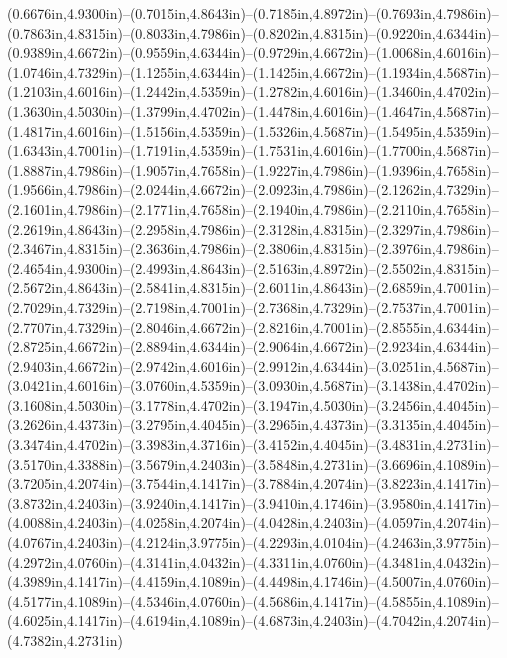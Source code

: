 (0.6676in,4.9300in)--(0.7015in,4.8643in)--(0.7185in,4.8972in)--(0.7693in,4.7986in)--(0.7863in,4.8315in)--(0.8033in,4.7986in)--(0.8202in,4.8315in)--(0.9220in,4.6344in)--(0.9389in,4.6672in)--(0.9559in,4.6344in)--(0.9729in,4.6672in)--(1.0068in,4.6016in)--(1.0746in,4.7329in)--(1.1255in,4.6344in)--(1.1425in,4.6672in)--(1.1934in,4.5687in)--(1.2103in,4.6016in)--(1.2442in,4.5359in)--(1.2782in,4.6016in)--(1.3460in,4.4702in)--(1.3630in,4.5030in)--(1.3799in,4.4702in)--(1.4478in,4.6016in)--(1.4647in,4.5687in)--(1.4817in,4.6016in)--(1.5156in,4.5359in)--(1.5326in,4.5687in)--(1.5495in,4.5359in)--(1.6343in,4.7001in)--(1.7191in,4.5359in)--(1.7531in,4.6016in)--(1.7700in,4.5687in)--(1.8887in,4.7986in)--(1.9057in,4.7658in)--(1.9227in,4.7986in)--(1.9396in,4.7658in)--(1.9566in,4.7986in)--(2.0244in,4.6672in)--(2.0923in,4.7986in)--(2.1262in,4.7329in)--(2.1601in,4.7986in)--(2.1771in,4.7658in)--(2.1940in,4.7986in)--(2.2110in,4.7658in)--(2.2619in,4.8643in)--(2.2958in,4.7986in)--(2.3128in,4.8315in)--(2.3297in,4.7986in)--(2.3467in,4.8315in)--(2.3636in,4.7986in)--(2.3806in,4.8315in)--(2.3976in,4.7986in)--(2.4654in,4.9300in)--(2.4993in,4.8643in)--(2.5163in,4.8972in)--(2.5502in,4.8315in)--(2.5672in,4.8643in)--(2.5841in,4.8315in)--(2.6011in,4.8643in)--(2.6859in,4.7001in)--(2.7029in,4.7329in)--(2.7198in,4.7001in)--(2.7368in,4.7329in)--(2.7537in,4.7001in)--(2.7707in,4.7329in)--(2.8046in,4.6672in)--(2.8216in,4.7001in)--(2.8555in,4.6344in)--(2.8725in,4.6672in)--(2.8894in,4.6344in)--(2.9064in,4.6672in)--(2.9234in,4.6344in)--(2.9403in,4.6672in)--(2.9742in,4.6016in)--(2.9912in,4.6344in)--(3.0251in,4.5687in)--(3.0421in,4.6016in)--(3.0760in,4.5359in)--(3.0930in,4.5687in)--(3.1438in,4.4702in)--(3.1608in,4.5030in)--(3.1778in,4.4702in)--(3.1947in,4.5030in)--(3.2456in,4.4045in)--(3.2626in,4.4373in)--(3.2795in,4.4045in)--(3.2965in,4.4373in)--(3.3135in,4.4045in)--(3.3474in,4.4702in)--(3.3983in,4.3716in)--(3.4152in,4.4045in)--(3.4831in,4.2731in)--(3.5170in,4.3388in)--(3.5679in,4.2403in)--(3.5848in,4.2731in)--(3.6696in,4.1089in)--(3.7205in,4.2074in)--(3.7544in,4.1417in)--(3.7884in,4.2074in)--(3.8223in,4.1417in)--(3.8732in,4.2403in)--(3.9240in,4.1417in)--(3.9410in,4.1746in)--(3.9580in,4.1417in)--(4.0088in,4.2403in)--(4.0258in,4.2074in)--(4.0428in,4.2403in)--(4.0597in,4.2074in)--(4.0767in,4.2403in)--(4.2124in,3.9775in)--(4.2293in,4.0104in)--(4.2463in,3.9775in)--(4.2972in,4.0760in)--(4.3141in,4.0432in)--(4.3311in,4.0760in)--(4.3481in,4.0432in)--(4.3989in,4.1417in)--(4.4159in,4.1089in)--(4.4498in,4.1746in)--(4.5007in,4.0760in)--(4.5177in,4.1089in)--(4.5346in,4.0760in)--(4.5686in,4.1417in)--(4.5855in,4.1089in)--(4.6025in,4.1417in)--(4.6194in,4.1089in)--(4.6873in,4.2403in)--(4.7042in,4.2074in)--(4.7382in,4.2731in) 